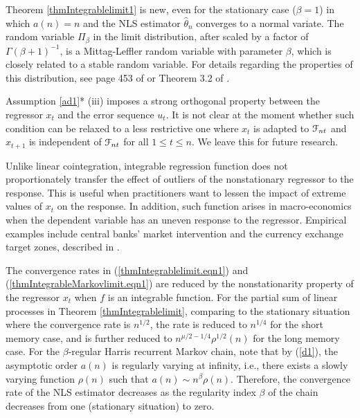 \begin{rem}
Theorem \ref{thmIntegrablelimit1} is new, even for the stationary case ($\beta = 1$) in which $a(n) = n$ and the NLS estimator $\hat{\theta}_n$ converges to a normal variate. The random variable $\Pi_{\beta}$ in the limit distribution, after scaled by a factor of $\Gamma(\beta+1)^{-1}$, is a Mittag-Leffler random variable with parameter $\beta$, which is closely related to a stable random variable. For details regarding the properties of this distribution, see page 453 of \cite{feller1971} or Theorem 3.2 of \cite{karlsentjostheim2001}.
\end{rem}



\begin{rem} Assumption \ref{ad1}* (iii) imposes a strong orthogonal property between the regressor $x_t$ and the error sequence $u_t$. It is not clear at the moment whether such condition can be relaxed to a less restrictive one where $x_t$ is adapted to $\mathcal F_{nt}$ and $x_{t+1}$ is independent of $\mathcal F_{nt}$ for all $1 \le t \le n$. We leave this for future research.
\end{rem}

\begin{rem}
Unlike linear cointegration, integrable regression function does not proportionately transfer the effect of outliers of the nonstationary regressor to the response. This is useful when practitioners want to lessen the impact of extreme values of $x_t$ on the response. In addition, such function arises in macro-economics when the dependent variable has an uneven response to the regressor. Empirical examples include central banks' market intervention and the currency exchange target zones, described in \cite{phillips2001}.
\end{rem}

\begin{rem}
The convergence rates in (\ref{thmIntegrablelimit.eqn1}) and (\ref{thmIntegrableMarkovlimit.eqn1}) are reduced by the nonstationarity property of the regressor $x_t$ when $f$ is an integrable function. For the partial sum of linear processes in Theorem \ref{thmIntegrablelimit}, comparing to the stationary situation where the convergence rate is $n^{1/2}$, the rate is reduced to $n^{1/4}$ for the short memory case, and is further reduced to $n^{\mu/2 - 1/4} \rho^{1/2}(n)$ for the long memory case. For the $\beta$-regular Harris recurrent Markov chain, note that by (\ref{d1}), the asymptotic order $a(n)$ is regularly varying at infinity, i.e., there exists a slowly varying function $\rho(n)$ such that $a(n) \sim  n^{\beta} \rho(n)$. Therefore, the convergence rate of the NLS estimator decreases as the regularity index $\beta$ of the chain decreases from one (stationary situation) to zero.
\end{rem}

